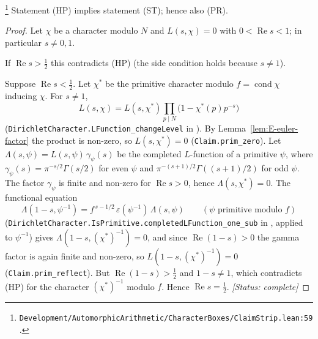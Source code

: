 \begin{proposition}[(HP) implies (ST)]\label{prop:E-strip}
\footnote{\nolinkurl{Development/AutomorphicArithmetic/CharacterBoxes/ClaimStrip.lean:59}.}%
Statement \textup{(HP)} implies statement \textup{(ST)}; hence also \textup{(PR)}.
\end{proposition}
\begin{proof}
Let $\chi$ be a character modulo $N$ and $L(s,\chi)=0$ with $0<\operatorname{Re}s<1$; in particular
$s\neq0,1$.

If $\operatorname{Re}s>\tfrac12$ this contradicts (HP) (the side condition holds because $s\neq1$).

Suppose $\operatorname{Re}s<\tfrac12$. Let $\chi^{*}$ be the primitive character modulo
$f=\operatorname{cond}\chi$ inducing $\chi$. For $s\neq1$,
\begin{equation}\label{eq:E-changelevel}
L(s,\chi)=L(s,\chi^{*})\prod_{p\mid N}\bigl(1-\chi^{*}(p)p^{-s}\bigr)
\end{equation}
(\texttt{DirichletCharacter.LFunction\_changeLevel} in \cite{E-mathlib-dircont}). By
Lemma~\ref{lem:E-euler-factor} the product is non-zero, so $L(s,\chi^{*})=0$
(\texttt{Claim.prim\_zero}). Let $\Lambda(s,\psi)=L(s,\psi)\,\gamma_\psi(s)$ be the completed
$L$-function of a primitive $\psi$, where $\gamma_\psi(s)=\pi^{-s/2}\Gamma(s/2)$ for even $\psi$ and
$\pi^{-(s+1)/2}\Gamma((s+1)/2)$ for odd $\psi$. The factor $\gamma_\psi$ is finite and non-zero for
$\operatorname{Re}s>0$, hence $\Lambda(s,\chi^{*})=0$. The functional equation
\[
\Lambda(1-s,\psi^{-1})=f^{\,s-1/2}\,\varepsilon(\psi^{-1})\,\Lambda(s,\psi)\qquad(\psi\text{ primitive modulo }f)
\]
(\texttt{DirichletCharacter.IsPrimitive.completedLFunction\_one\_sub} in \cite{E-mathlib-dircont},
applied to $\psi^{-1}$) gives $\Lambda(1-s,(\chi^{*})^{-1})=0$, and since
$\operatorname{Re}(1-s)>0$ the gamma factor is again finite and non-zero, so
$L(1-s,(\chi^{*})^{-1})=0$ (\texttt{Claim.prim\_reflect}). But
$\operatorname{Re}(1-s)>\tfrac12$ and $1-s\neq1$, which contradicts (HP) for the character
$(\chi^{*})^{-1}$ modulo $f$. Hence $\operatorname{Re}s=\tfrac12$.
\textit{[Status: complete]}
\end{proof}


